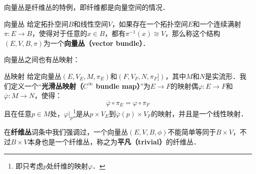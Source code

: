 
向量丛是纤维丛的特例，即纤维都是向量空间的情况．

\begin{definition}{向量丛}
给定拓扑空间$B$和线性空间$V$，如果存在一个拓扑空间$E$和一个连续满射$\pi:E\rightarrow B$，使得对于任意的$x\in B$，都有$\pi^{-1}(x)\cong V$，那么称这个结构$(E, V, B, \pi)$为一个\textbf{向量丛（vector bundle）}．
\end{definition}

向量丛之间也有丛映射：

\begin{definition}{丛映射}
给定向量丛$(E, V_E, M, \pi_E)$和$(F, V_F, N, \pi_F])$，其中$M$和$N$是实流形．我们定义一个“\textbf{光滑丛映射（$C^\infty$ bundle map）}”为$E\rightarrow F$的映射偶$\varphi: E\rightarrow F$和$\overline{\varphi}: M\rightarrow N$，使得：
\begin{equation}
\overline{\varphi}\circ\pi_E=\varphi\circ\pi_F
\end{equation}
且在任意$p\in M$处，$\varphi|_p$\footnote{即只考虑$p$处纤维的映射$\varphi$．}是从$p\times V_E$到$\overline{\varphi}(p)\times V_F$的映射，并且是一个线性映射．
\end{definition}

在\textbf{纤维丛}词条中我们强调过，一个向量丛$(E, V, B, \phi)$不能简单等同于$B\times V$，不过$B\times V$本身也是一个纤维丛，称之为\textbf{平凡（trivial）}的纤维丛．




